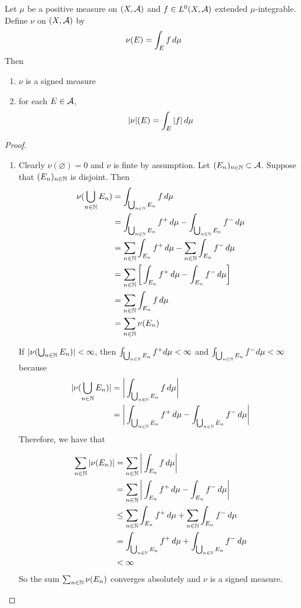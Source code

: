 \documentclass{book}
\begin{document}
	\begin{ex}  
		Let $\mu$ be a positive measure on $(X, \mathcal{A})$ and $f \in L^0(X, \mathcal{A})$ extended $\mu$-integrable. Define $\nu$ on $(X, \mathcal{A})$ by $$\nu(E) = \int_E f \, d \mu$$ Then
		\begin{enumerate}
			\item $\nu$ is a signed measure
			\item for each $E\in \mathcal{A}$, $$|\nu|(E) = \int_E|f|\, d \mu$$
		\end{enumerate} 
	\end{ex}
	
	\begin{proof}
		
		\begin{enumerate}
			
			\item Clearly $\nu(\varnothing) = 0$ and $\nu$ is finte by assumption. Let $(E_n)_{n \in \mathbb{N}} \subset \mathcal{A}$. Suppose that $(E_n)_{n \in \mathbb{N}}$ is disjoint. Then 
			\begin{align*}
				\nu(\bigcup_{n \in \mathbb{N}} E_n)
				&= \int_{\bigcup_{n \in \mathbb{N}} E_n} f \, d \mu \\ 
				&= \int_{\bigcup_{n \in \mathbb{N}} E_n} f^+ \, d \mu - \int_{\bigcup_{n \in \mathbb{N}} E_n} f^- \, d \mu\\
				&= \sum_{n \in \mathbb{N}} \int_{ E_n} f^+ \, d \mu - \sum_{n \in \mathbb{N}} \int_{E_n} f^- \, d \mu\\
				&= \sum_{n \in \mathbb{N}} \bigg[ \int_{ E_n} f^+ \, d \mu - \int_{ E_n} f^- \, d \mu \bigg]\\
				&= \sum_{n \in \mathbb{N}} \int_{ E_n} f \, d \mu\\
				&= \sum_{n \in \mathbb{N}} \nu(E_n)
			\end{align*}
			
			If $|\nu(\bigcup_{n \in \mathbb{N}}E_n)| < \infty$, then $ \int_{\bigcup_{n \in \mathbb{N}} E_n} f^+ d  \mu < \infty$ and $ \int_{\bigcup_{n \in \mathbb{N}} E_n} f^- d  \mu < \infty$ because
			\begin{align*}
				|\nu(\bigcup_{n \in \mathbb{N}}E_n)|
				&=\bigg |\int_{\bigcup_{n \in \mathbb{N}} E_n} f \, d \mu\bigg| \\
				&= \bigg |\int_{\bigcup_{n \in \mathbb{N}} E_n} f^+ \, d \mu - \int_{\bigcup_{n \in \mathbb{N}} E_n} f^- \, d \mu \bigg|
			\end{align*} Therefore, we have that
			
			\begin{align*}
				\sum_{n \in \mathbb{N}} |\nu(E_n)|
				&=  \sum_{n \in \mathbb{N}} \bigg|\int_{E_n} f \, d \mu \bigg|\\
				&= \sum_{n \in \mathbb{N}} \bigg| \int_{E_n} f^+ \, d \mu -  \int_{E_n} f^- \, d \mu \bigg|\\
				& \leq \sum_{n \in \mathbb{N}}  \int_{E_n} f^+ \, d \mu  + \sum_{n \in \mathbb{N}}  \int_{E_n} f^- \, d \mu \\
				&= \int_{\bigcup_{n \in \mathbb{N}} E_n} f^+ \, d \mu + \int_{\bigcup_{n \in \mathbb{N}} E_n} f^- \, d \mu\\
				& < \infty
			\end{align*}
			So the sum $\sum_{n \in \mathbb{N}} \nu(E_n)$ converges absolutely and $\nu$ is a signed measure. 
			

\end{enumerate}
\end{proof}
\end{document}
